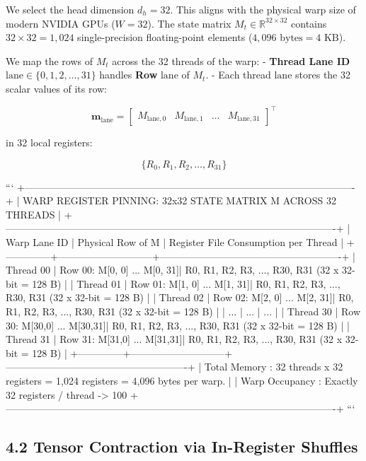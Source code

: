 \documentclass[11pt,twoside,openright]{amsbook}
\begin{document}
{{{{{{{We select the head dimension $d_h = 32$. This aligns with the physical warp size of modern NVIDIA GPUs ($W = 32$). The state matrix $M_t \in \mathbb{R}^{32 \times 32}$ contains $32 \times 32 = 1,024$ single-precision floating-point elements ($4,096\text{ bytes} = 4\text{ KB}$).

We map the rows of $M_t$ across the 32 threads of the warp:
- \textbf{Thread Lane ID} $\text{lane} \in \{0, 1, 2, \dots, 31\}$ handles \textbf{Row} $\text{lane}$ of $M_t$.
- Each thread $\text{lane}$ stores the 32 scalar values of its row:

$$\mathbf{m}_{\text{lane}} = \begin{bmatrix} M_{\text{lane}, 0} & M_{\text{lane}, 1} & \dots & M_{\text{lane}, 31} \end{bmatrix}^\top$$

in 32 local registers:

$$\{R_{0}, R_{1}, R_{2}, \dots, R_{31}\}$$

```
+----------------------------------------------------------------------------------------------------+
| WARP REGISTER PINNING: 32x32 STATE MATRIX M ACROSS 32 THREADS                                      |
+----------------------------------------------------------------------------------------------------+
| Warp Lane ID | Physical Row of M           | Register File Consumption per Thread                  |
+--------------+-----------------------------+-------------------------------------------------------+
| Thread 00    | Row 00: M[0, 0] ... M[0, 31]| R0, R1, R2, R3, ..., R30, R31 (32 x 32-bit = 128 B)   |
| Thread 01    | Row 01: M[1, 0] ... M[1, 31]| R0, R1, R2, R3, ..., R30, R31 (32 x 32-bit = 128 B)   |
| Thread 02    | Row 02: M[2, 0] ... M[2, 31]| R0, R1, R2, R3, ..., R30, R31 (32 x 32-bit = 128 B)   |
| ...          | ...                         | ...                                                   |
| Thread 30    | Row 30: M[30,0] ... M[30,31]| R0, R1, R2, R3, ..., R30, R31 (32 x 32-bit = 128 B)   |
| Thread 31    | Row 31: M[31,0] ... M[31,31]| R0, R1, R2, R3, ..., R30, R31 (32 x 32-bit = 128 B)   |
+--------------+-----------------------------+-------------------------------------------------------+
| Total Memory : 32 threads x 32 registers = 1,024 registers = 4,096 bytes per warp.                |
| Warp Occupancy : Exactly 32 registers / thread -> 100%
+----------------------------------------------------------------------------------------------------+
```

\subsection{4.2 Tensor Contraction via In-Register Shuffles}

}}}}}}}
\end{document}
